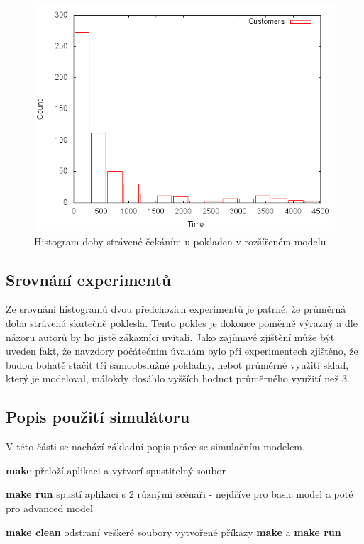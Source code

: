 \documentclass[12pt,a4paper,titlepage]{article}
\begin{document}
\begin{figure}[h]
\centering
\includegraphics[scale=0.75]{advanced}
\caption{Histogram doby strávené čekáním u pokladen v rozšířeném modelu}
\end{figure}

\subsection{Srovnání experimentů}
Ze srovnání histogramů dvou předchozích experimentů je patrné, že průměrná doba strávená skutečně poklesla. Tento pokles je dokonce poměrně výrazný a dle názoru autorů by ho jistě zákazníci uvítali. Jako zajímavé zjištění může být uveden fakt, že navzdory počátečním úvahám bylo při experimentech zjištěno, že budou bohatě stačit tři samoobslužné pokladny, neboť průměrné využití sklad, který je modeloval, málokdy dosáhlo vyšších hodnot průměrného využití než 3. 
\subsection{Popis použití simulátoru}
V této části se nachází základní popis práce se simulačním modelem.

\textbf{make} přeloží aplikaci a vytvorí spustitelný soubor

\textbf{make run} spustí aplikaci s 2 různými scénaři - nejdříve pro basic model a poté pro advanced model

\textbf{make clean} odstraní veškeré soubory vytvořené příkazy \textbf{make} a \textbf{make run}
\end{document}
